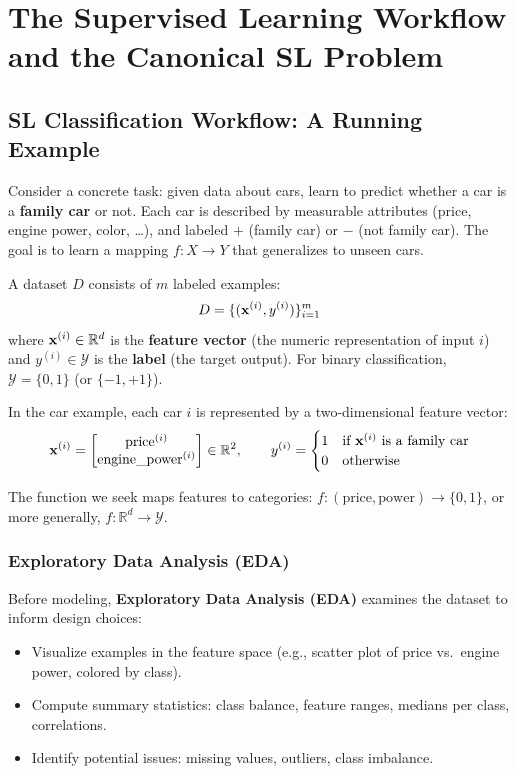 \chapter*{The Supervised Learning Workflow and the Canonical SL Problem}

\section*{SL Classification Workflow: A Running Example}

Consider a concrete task: given data about cars, learn to predict whether a car is a \textbf{family car} or not. Each car is described by measurable attributes (price, engine power, color, \ldots), and labeled $+$ (family car) or $-$ (not family car). The goal is to learn a mapping $f: X \to Y$ that generalizes to unseen cars.

\begin{definition}
A dataset $D$ consists of $m$ labeled examples:
$$D = \{(\mathbf{x}^{(i)}, y^{(i)})\}_{i=1}^{m}$$
where $\mathbf{x}^{(i)} \in \mathbb{R}^d$ is the \textbf{feature vector} (the numeric representation of input $i$) and $y^{(i)} \in \mathcal{Y}$ is the \textbf{label} (the target output). For binary classification, $\mathcal{Y} = \{0, 1\}$ (or $\{-1, +1\}$).
\end{definition}

In the car example, each car $i$ is represented by a two-dimensional feature vector:
$$\mathbf{x}^{(i)} = \begin{bmatrix} \text{price}^{(i)} \\ \text{engine\_power}^{(i)} \end{bmatrix} \in \mathbb{R}^2, \qquad y^{(i)} = \begin{cases} 1 & \text{if } \mathbf{x}^{(i)} \text{ is a family car} \\ 0 & \text{otherwise} \end{cases}$$

The function we seek maps features to categories: $f: (\text{price}, \text{power}) \to \{0, 1\}$, or more generally, $f: \mathbb{R}^d \to \mathcal{Y}$.

\subsection*{Exploratory Data Analysis (EDA)}

Before modeling, \textbf{Exploratory Data Analysis (EDA)} examines the dataset to inform design choices:
\begin{itemize}
    \item Visualize examples in the feature space (e.g., scatter plot of price vs.\ engine power, colored by class).
    \item Compute summary statistics: class balance, feature ranges, medians per class, correlations.
    \item Identify potential issues: missing values, outliers, class imbalance.
\end{itemize}

